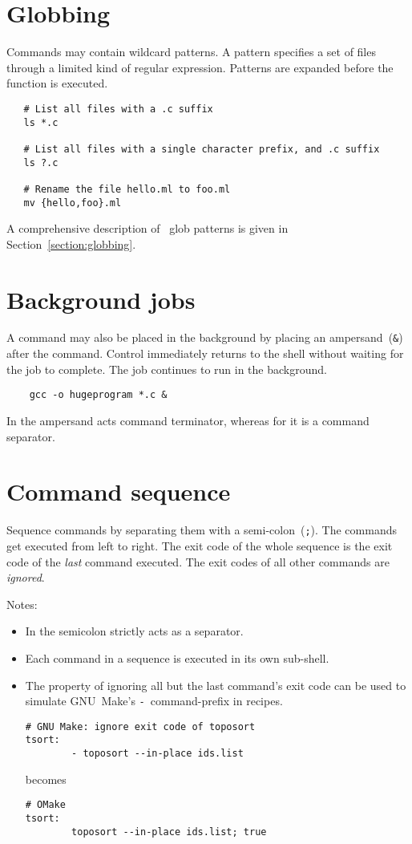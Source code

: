 \section{Globbing}

Commands may contain wildcard patterns.  A pattern specifies a set of files through a limited kind
of regular expression.  Patterns are expanded before the function is executed.

\begin{verbatim}
   # List all files with a .c suffix
   ls *.c

   # List all files with a single character prefix, and .c suffix
   ls ?.c

   # Rename the file hello.ml to foo.ml
   mv {hello,foo}.ml
\end{verbatim}

A comprehensive description of \OMake~glob patterns is given in Section~\ref{section:globbing}.

\section{Background jobs}

A command may also be placed in the background by placing an ampersand~(\verb+&+) after the command.
Control immediately returns to the shell without waiting for the job to complete.  The job continues
to run in the background.

\begin{verbatim}
    gcc -o hugeprogram *.c &
\end{verbatim}

In  the ampersand acts command terminator, whereas for  it is a command
separator.

\section{Command sequence}\label{section:command-sequence}

Sequence commands by separating them with a semi-colon~(\verb+;+).  The commands get executed from
left to right.  The exit code of the whole sequence is the exit code of the \emph{last} command
executed.  The exit codes of all other commands are \emph{ignored}.

Notes:

\begin{itemize}
  \item In  the semicolon strictly acts as a separator.
  \item Each command in a sequence is executed in its own sub-shell.
  \item The property of ignoring all but the last command's exit code can be used to simulate
    GNU~Make's \verb+-+~command-prefix in recipes.
\begin{verbatim}
# GNU Make: ignore exit code of toposort
tsort:
        - toposort --in-place ids.list
\end{verbatim}
    becomes
\begin{verbatim}
# OMake
tsort:
        toposort --in-place ids.list; true
\end{verbatim}
\end{itemize}

